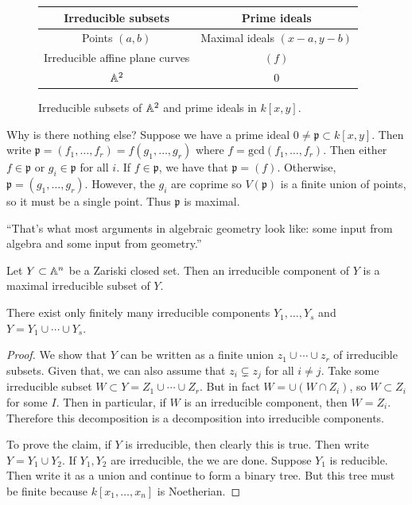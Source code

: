 \documentclass[twoside, 10pt]{article}
\begin{document}
    \begin{figure}[H]
        \begin{center}
            \begin{tabular}{cc}
                \toprule
                Irreducible subsets & Prime ideals \\
                \midrule
                Points $(a,b)$ & Maximal ideals $(x-a, y-b)$ \\
                Irreducible affine plane curves & $(f)$ \\
                $\mathbb{A}^2$ & 0 \\
                \bottomrule
            \end{tabular}
        \end{center}
        \caption{Irreducible subsets of $\mathbb{A}^2$ and prime ideals in $k[x,y]$.}%
        \label{fig:irreducible-subsets-prime-ideals}
    \end{figure}

    Why is there nothing else? Suppose we have a prime ideal $0 \neq \mathfrak{p} \subset k[x,y]$. Then write $\mathfrak{p} = (f_1, \ldots, f_r) = f(g_1, \ldots, g_r)$ where $f = \mathrm{gcd}(f_1, \ldots, f_r)$. Then either $f \in \mathfrak{p}$ or $g_i \in \mathfrak{p}$ for all $i$. If $f \in \mathfrak{p}$, we have that $\mathfrak{p} = (f)$. Otherwise, $\mathfrak{p} = (g_1, \ldots, g_r)$. However, the $g_i$ are coprime so $V(\mathfrak{p})$ is a finite union of points, so it must be a single point. Thus $\mathfrak{p}$ is maximal.

    ``That's what most arguments in algebraic geometry look like: some input from algebra and some input from geometry.''

    \begin{defn}
        Let $Y \subset \mathbb{A}^n$ be a Zariski closed set. Then an irreducible component of $Y$ is a maximal irreducible subset of $Y$.
    \end{defn}

    \begin{lem}
        There exist only finitely many irreducible components $Y_1, \ldots, Y_s$ and $Y = Y_1 \cup \cdots \cup Y_s$.
        \begin{proof}
            We show that $Y$ can be written as a finite union $z_1 \cup \cdots \cup z_r$ of irreducible subsets. Given that, we can also assume that $z_i \subsetneq z_j$ for all $i \neq j$. Take some irreducible subset $W \subset Y = Z_1 \cup \cdots \cup Z_r$. But in fact $W = \cup (W \cap Z_i)$, so $W \subset Z_i$ for some $I$. Then in particular, if $W$ is an irreducible component, then $W = Z_i$. Therefore this decomposition is a decomposition into irreducible components.

            To prove the claim, if $Y$ is irreducible, then clearly this is true. Then write $Y = Y_1 \cup Y_2$. If $Y_1, Y_2$ are irreducible, the we are done. Suppose $Y_1$ is reducible. Then write it as a union and continue to form a binary tree. But this tree must be finite because $k[x_1, \ldots, x_n]$ is Noetherian.
        \end{proof}
    \end{lem}
\end{document}
